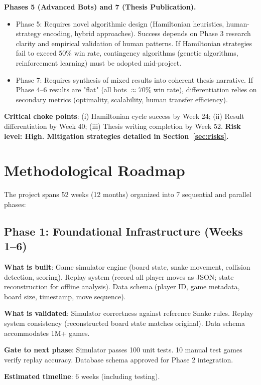 \documentclass[11pt,a4paper]{article}
\begin{document}
\textbf{Phases 5 (Advanced Bots) and 7 (Thesis Publication).}
\begin{itemize}
    \item Phase 5: Requires novel algorithmic design (Hamiltonian heuristics, human-strategy encoding, hybrid approaches). Success depends on Phase 3 research clarity and empirical validation of human patterns. If Hamiltonian strategies fail to exceed 50\% win rate, contingency algorithms (genetic algorithms, reinforcement learning) must be adopted mid-project.
    \item Phase 7: Requires synthesis of mixed results into coherent thesis narrative. If Phase 4--6 results are "flat" (all bots $\approx 70\%$ win rate), differentiation relies on secondary metrics (optimality, scalability, human transfer efficiency).
\end{itemize}
\textbf{Critical choke points}: (i) Hamiltonian cycle success by Week 24; (ii) Result differentiation by Week 40; (iii) Thesis writing completion by Week 52. \textbf{Risk level: High. Mitigation strategies detailed in Section~\ref{sec:risks}.}

\section{Methodological Roadmap}
\label{sec:roadmap}

The project spans 52 weeks (12 months) organized into 7 sequential and parallel phases:

\subsection*{Phase 1: Foundational Infrastructure (Weeks 1--6)}
\textbf{What is built}: Game simulator engine (board state, snake movement, collision detection, scoring). Replay system (record all player moves as JSON; state reconstruction for offline analysis). Data schema (player ID, game metadata, board size, timestamp, move sequence).

\textbf{What is validated}: Simulator correctness against reference Snake rules. Replay system consistency (reconstructed board state matches original). Data schema accommodates 1M+ games.

\textbf{Gate to next phase}: Simulator passes 100 unit tests. 10 manual test games verify replay accuracy. Database schema approved for Phase 2 integration.

\textbf{Estimated timeline}: 6 weeks (including testing).
\end{document}
